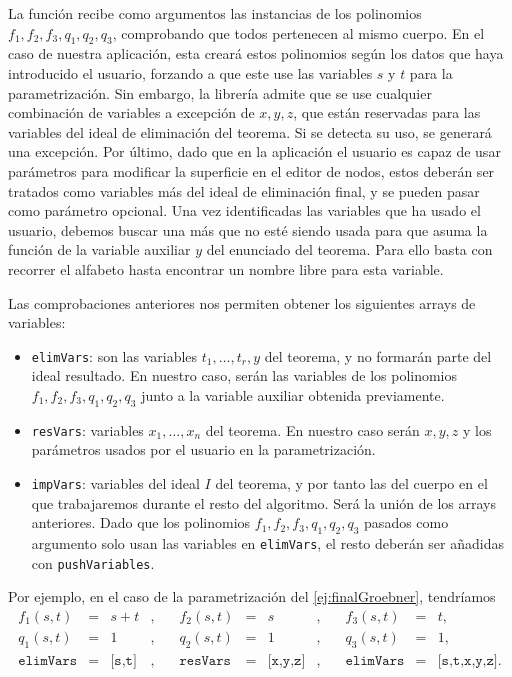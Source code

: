 La función recibe como argumentos las instancias de los polinomios $f_1,f_2,f_3,q_1,q_2,q_3$, comprobando que todos pertenecen al mismo cuerpo. En el caso de nuestra aplicación, esta creará estos polinomios según los datos que haya introducido el usuario, forzando a que este use las variables $s$ y $t$ para la parametrización. Sin embargo, la librería admite que se use cualquier combinación de variables a excepción de $x,y,z$, que están reservadas para las variables del ideal de eliminación del teorema. Si se detecta su uso, se generará una excepción. Por último, dado que en la aplicación el usuario es capaz de usar parámetros para modificar la superficie en el editor de nodos, estos deberán ser tratados como variables más del ideal de eliminación final, y se pueden pasar como parámetro opcional. Una vez identificadas las variables que ha usado el usuario, debemos buscar una más que no esté siendo usada para que asuma la función de la variable auxiliar $y$ del enunciado del teorema. Para ello basta con recorrer el alfabeto hasta encontrar un nombre libre para esta variable.\newline

Las comprobaciones anteriores nos permiten obtener los siguientes arrays de variables:
\begin{itemize}
    \item \texttt{elimVars}: son las variables $t_1,\dots, t_r,y$ del teorema, y no formarán parte del ideal resultado. En nuestro caso, serán las variables de los polinomios $f_1,f_2,f_3,q_1,q_2,q_3$ junto a la variable auxiliar obtenida previamente.
    \item \texttt{resVars}: variables $x_1,\dots, x_n$ del teorema. En nuestro caso serán $x,y,z$ y los parámetros usados por el usuario en la parametrización.
    \item \texttt{impVars}: variables del ideal $I$ del teorema, y por tanto las del cuerpo en el que trabajaremos durante el resto del algoritmo. Será la unión de los arrays anteriores. Dado que los polinomios $f_1,f_2,f_3,q_1,q_2,q_3$ pasados como argumento solo usan las variables en \texttt{elimVars}, el resto deberán ser añadidas con \texttt{pushVariables}.
\end{itemize}
Por ejemplo, en el caso de la parametrización del \autoref{ej:finalGroebner}, tendríamos
\begin{align*}
    f_1(s,t)&=&s+t&,\quad &f_2(s,t)&=&s&,\quad &f_3(s,t)&=&t,\\[7pt]
    q_1(s,t)&=&1&,\quad &q_2(s,t)&=&1&,\quad &q_3(s,t)&=&1,\\[7pt]
    \texttt{elimVars}&=&\texttt{[s,t]}&,\quad &\texttt{resVars}&=&\texttt{[x,y,z]}&,\quad &\texttt{elimVars}&=&\texttt{[s,t,x,y,z]}.
\end{align*}

